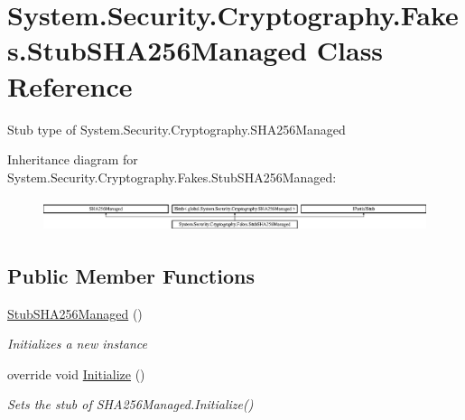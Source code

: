 \hypertarget{class_system_1_1_security_1_1_cryptography_1_1_fakes_1_1_stub_s_h_a256_managed}{\section{System.\-Security.\-Cryptography.\-Fakes.\-Stub\-S\-H\-A256\-Managed Class Reference}
\label{class_system_1_1_security_1_1_cryptography_1_1_fakes_1_1_stub_s_h_a256_managed}
}


Stub type of System.\-Security.\-Cryptography.\-S\-H\-A256\-Managed 


Inheritance diagram for System.\-Security.\-Cryptography.\-Fakes.\-Stub\-S\-H\-A256\-Managed\-:\begin{figure}[H]
\begin{center}
\leavevmode
\includegraphics[height=0.964686cm]{class_system_1_1_security_1_1_cryptography_1_1_fakes_1_1_stub_s_h_a256_managed}
\end{center}
\end{figure}
\subsection*{Public Member Functions}
\begin{DoxyCompactItemize}
\item 
\hyperlink{class_system_1_1_security_1_1_cryptography_1_1_fakes_1_1_stub_s_h_a256_managed_a7737c026cba8bcaea671be6325fb8f9e}{Stub\-S\-H\-A256\-Managed} ()
\begin{DoxyCompactList}\small\item\em Initializes a new instance\end{DoxyCompactList}\item 
override void \hyperlink{class_system_1_1_security_1_1_cryptography_1_1_fakes_1_1_stub_s_h_a256_managed_ad702b4f4cca59bc262de11207f59badd}{Initialize} ()
\begin{DoxyCompactList}\small\item\em Sets the stub of S\-H\-A256\-Managed.\-Initialize()\end{DoxyCompactList}\end{DoxyCompactItemize}
